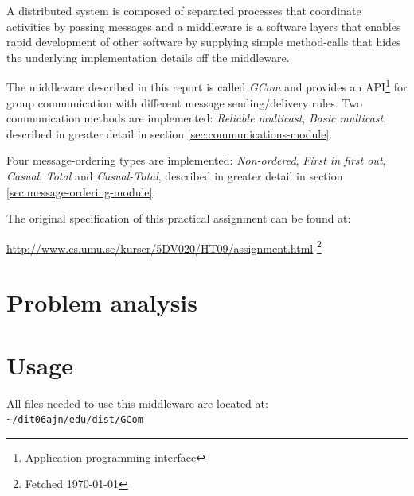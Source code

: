 \documentclass[titlepage, twocolumn, a4paper, 10pt]{article}
\def\pathtocode{\url{~/dit06ajn/edu/dist/GCom}}
\begin{document}
A distributed system is composed of separated processes that
coordinate activities by passing messages and a middleware is a
software layers that enables rapid development of other software by
supplying simple method-calls that hides the underlying implementation
details off the middleware.

The middleware described in this report is called \textit{GCom} and
provides an API\footnote{Application programming interface} for group
communication with different message sending/delivery rules. Two
communication methods are implemented: \textit{Reliable multicast},
\textit{Basic multicast}, described in greater detail in section
\ref{sec:communications-module}.

Four message-ordering types are implemented: \textit{Non-ordered},
\textit{First in first out}, \textit{Casual}, \textit{Total} and
\textit{Casual-Total}, described in greater detail in section
\ref{sec:message-ordering-module}.

The original specification of this practical assignment can be found at:\\
\begin{footnotesize}
  \url{http://www.cs.umu.se/kurser/5DV020/HT09/assignment.html}
  \footnote{Fetched \today} %
\end{footnotesize}

\section{Problem analysis}\label{sec:problem-analysis}

\section{Usage}\label{sec:usage}
All files needed to use this middleware are located at:\\
\texttt{\pathtocode}
\end{document}
